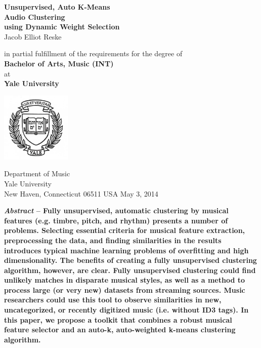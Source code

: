 \documentclass[12pt,twocolumn,titlepage]{article}
\begin{document}
\begin{titlepage}
\thispagestyle{empty}

    \begin{center}
        
        \Huge
        \textbf{Unsupervised, Auto K-Means \\Audio Clustering\\using Dynamic Weight Selection} \\
        \vspace{0.5cm}
        \Large
        Jacob Elliot Reske
        \Large

        \vspace{1.5cm}
        
        \large
        in partial fulfillment of the requirements for the degree of\\
        \textbf{Bachelor of Arts, Music (INT)}\\
        at\\
        \textbf{Yale University}
        \large
        \vspace{5.5cm}
        
        \includegraphics[width=0.25\textwidth]{yale}
        
        \Large
        \small
        Department of Music\\
        Yale University\\
        New Haven, Connecticut 06511 USA
        May 3, 2014
        \small
    \end{center}
\end{titlepage}


\textbf{\emph{Abstract} -- Fully unsupervised, automatic clustering by musical features (e.g. timbre, pitch, and rhythm) presents a number of problems. Selecting essential criteria for musical feature extraction, preprocessing the data, and finding similarities in the results introduces typical machine learning problems of overfitting and high dimensionality. The benefits of creating a fully unsupervised clustering algorithm, however, are clear. Fully unsupervised clustering could find unlikely matches in disparate musical styles, as well as a method to process large (or very new) datasets from streaming sources. Music researchers could use this tool to observe similarities in new, uncategorized, or recently digitized music (i.e. without ID3 tags). In this paper, we propose a toolkit that combines a robust musical feature selector and an auto-k, auto-weighted k-means clustering algorithm.}
\end{document}
